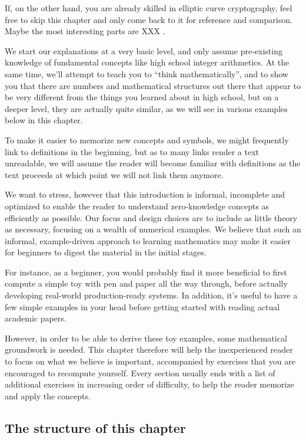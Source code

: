 If, on the other hand, you are already skilled in elliptic curve cryptography, feel free to skip this chapter and only come back to it for reference and comparison. Maybe the most interesting parts are XXX .

We start our explanations at a very basic level, and only assume pre-existing knowledge of fundamental concepts like high school integer arithmetics. At the same time, we'll attempt to teach you to ``think mathematically'', and to show you that there are numbers and mathematical structures out there that appear to be very different from the things you learned about in high school, but on a deeper level, they are actually quite similar, as we will see in various examples below in this chapter.

To make it easier to memorize new concepts and symbols, we might frequently link to definitions in the beginning, but as to many links render a text unreadable, we will assume the reader will become familiar with definitions as the text proceeds at which point we will not link them anymore.

We want to stress, however that this introduction is informal, incomplete and optimized to enable the reader to understand zero-knowledge concepts as efficiently as possible. Our focus and design choices are to include as little theory as necessary, focusing on a wealth of numerical examples. We believe that such an informal, example-driven approach to learning mathematics may make it easier for beginners to digest the material in the initial stages. 

For instance, as a beginner, you would probably find it more beneficial to first compute a simple toy  with pen and paper all the way through, before actually developing real-world production-ready systems. In addition, it's useful to have a few simple examples in your head before getting started with reading actual academic papers.

However, in order to be able to derive these toy examples, some mathematical groundwork is needed. This chapter therefore will help the inexperienced reader to focus on what we believe is important, accompanied by exercises that you are encouraged to recompute yourself. Every section usually ends with a list of additional exercises in increasing order of difficulty, to help the reader memorize and apply the concepts. 


\subsection{The structure of this chapter}

